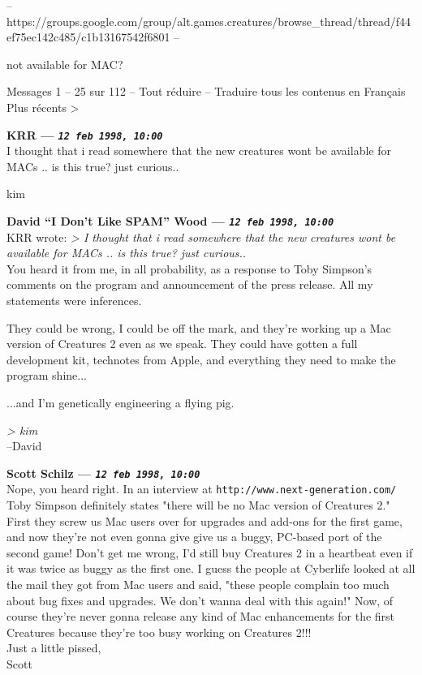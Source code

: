 \documentclass[11pt,twoside,a4paper]{article}
\title{\txtTITLE}
\date{ --- }
\begin{document}

\setlength\parindent{0pt} %

-- https://groups.google.com/group/alt.games.creatures/browse\_thread/thread/f44ef75ec142c485/c1b13167542f6801 -- 

\begin{multicols*}{2}
	 \footnotesize
 	
not available for MAC?
	
	  	Messages 1 -- 25 sur 112 -- Tout r{\'e}duire  --  Traduire tous les contenus en Fran\c{c}ais 	  Plus r{\'e}cents >
	
		
\textbf{KRR --- \emph{\texttt{12 feb 1998, 10:00}}}~\\

I thought that i read somewhere that the new creatures wont be available for MACs ..    is this true?    just curious..

kim
	
	
		
\textbf{David ``I Don't Like SPAM'' Wood --- \emph{\texttt{12 feb 1998, 10:00}}}~\\

KRR wrote:
\emph{> I thought that i read somewhere that the new creatures wont be available for MACs ..    is this true?    just curious..}~\\

You heard it from me, in all probability, as a response to Toby Simpson's comments on the program and announcement of the press release. All my statements were inferences.

They could be wrong, I could be off the mark, and they're working up a Mac version of Creatures 2 even as we speak. They could have gotten a full development kit, technotes from Apple, and everything they need to make the program shine...

...and I'm genetically engineering a flying pig.

\emph{> kim}~\\

--David

 
		
	
		
\textbf{Scott Schilz --- \emph{\texttt{12 feb 1998, 10:00}}}~\\

Nope, you heard right. In an interview at \texttt{http://www.next-generation.com/} Toby Simpson definitely states "there will be no Mac version of Creatures 2."~\\
First they screw us Mac users over for upgrades and add-ons for the first game, and now they're not even gonna give give us a buggy, PC-based port of the second game! Don't get me wrong, I'd still buy Creatures 2 in a heartbeat even if it was twice as buggy as the first one. I guess the people at Cyberlife looked at all the mail they got from Mac users and said, "these people complain too much about bug fixes and upgrades. We don't wanna deal with this again!" Now, of course they're never gonna release any kind of Mac enhancements for the first Creatures because they're too busy working on Creatures 2!!!~\\
Just a little pissed,~\\
Scott


\end{multicols*}
\end{document}
